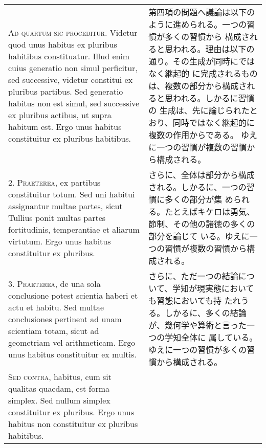 \documentclass[10pt]{jsarticle} %
\begin{document}
\begin{longtable}{p{21em}p{21em}}
{\scshape Ad quartum sic proceditur}. Videtur quod unus habitus ex
pluribus habitibus constituatur. Illud enim cuius generatio non simul
perficitur, sed successive, videtur constitui ex pluribus
partibus. Sed generatio habitus non est simul, sed successive ex
pluribus actibus, ut supra habitum est. Ergo unus habitus constituitur
ex pluribus habitibus.

&

第四項の問題へ議論は以下のように進められる。一つの習慣が多くの習慣から
構成されると思われる。理由は以下の通り。その生成が同時にではなく継起的
に完成されるものは、複数の部分から構成されると思われる。しかるに習慣の
生成は、先に論じられたとおり、同時ではなく継起的に複数の作用からである。
ゆえに一つの習慣が複数の習慣から構成される。

\\



2. {\scshape Praeterea}, ex partibus constituitur totum. Sed uni
habitui assignantur multae partes, sicut Tullius ponit multas partes
fortitudinis, temperantiae et aliarum virtutum. Ergo unus habitus
constituitur ex pluribus.

&

さらに、全体は部分から構成される。しかるに、一つの習慣に多くの部分が集
められる。たとえばキケロは勇気、節制、その他の諸徳の多くの部分を論じて
いる。ゆえに一つの習慣が複数の習慣から構成される。

\\



3. {\scshape Praeterea}, de una sola conclusione potest scientia
haberi et actu et habitu. Sed multae conclusiones pertinent ad unam
scientiam totam, sicut ad geometriam vel arithmeticam. Ergo unus
habitus constituitur ex multis.

&

さらに、ただ一つの結論について、学知が現実態においても習態においても持
たれうる。しかるに、多くの結論が、幾何学や算術と言った一つの学知全体に
属している。ゆえに一つの習慣が多くの習慣から構成される。

\\



{\scshape Sed contra}, habitus, cum sit qualitas quaedam, est forma
simplex. Sed nullum simplex constituitur ex pluribus. Ergo unus
habitus non constituitur ex pluribus habitibus.

&


\end{longtable}
\end{document}
